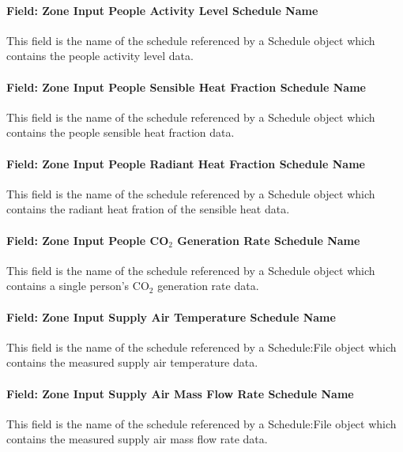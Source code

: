 \paragraph{Field: Zone Input People Activity Level Schedule Name}\label{field-zone-input-people-activity-schedule-name-hm}
This field is the name of the schedule referenced by a Schedule object which contains the people activity level data.

\paragraph{Field: Zone Input People Sensible Heat Fraction Schedule Name}\label{field-zone-input-people-sensible-heat-fraction-schedule-name-hm}
This field is the name of the schedule referenced by a Schedule object which contains the people sensible heat fraction data.

\paragraph{Field: Zone Input People Radiant Heat Fraction Schedule Name}\label{field-zone-input-people-radiant-heat-fraction-schedule-name-hm}
This field is the name of the schedule referenced by a Schedule object which contains the radiant heat fration of the sensible heat data.

\paragraph{Field: Zone Input People CO$_2$ Generation Rate Schedule Name}\label{field-zone-input-people-co2-generation-rate-schedule-name-hm}
This field is the name of the schedule referenced by a Schedule object which contains a single person's CO$_2$ generation rate data.

\paragraph{Field: Zone Input Supply Air Temperature Schedule Name}\label{field-zone-input-supply-air-temperature-schedule-name-hm}
This field is the name of the schedule referenced by a Schedule:File object which contains the measured supply air temperature data.

\paragraph{Field: Zone Input Supply Air Mass Flow Rate Schedule Name}\label{field-zone-input-supply-air-mass-flow-rate-schedule-name-hm}
This field is the name of the schedule referenced by a Schedule:File object which contains the measured supply air mass flow rate data.

